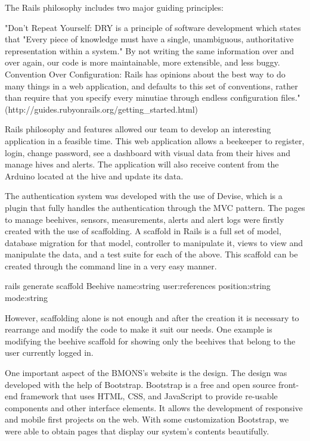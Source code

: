 The Rails philosophy includes two major guiding principles:

"Don't Repeat Yourself: DRY is a principle of software development which states that "Every piece of knowledge must have a single, unambiguous, authoritative representation within a system." By not writing the same information over and over again, our code is more maintainable, more extensible, and less buggy.
Convention Over Configuration: Rails has opinions about the best way to do many things in a web application, and defaults to this set of conventions, rather than require that you specify every minutiae through endless configuration files."
(http://guides.rubyonrails.org/getting_started.html)

Rails philosophy and features allowed our team to develop an interesting application in a feasible time. This web application allows a beekeeper to register, login, change password, see a dashboard with visual data from their hives and manage hives and alerts. The application will also receive content from the Arduino located at the hive and update its data.

The authentication system was developed with the use of Devise, which is a plugin that fully handles the authentication through the MVC pattern. The pages to manage beehives, sensors, measurements, alerts and alert logs were firstly created with the use of scaffolding. A scaffold in Rails is a full set of model, database migration for that model, controller to manipulate it, views to view and manipulate the data, and a test suite for each of the above. This scaffold can be created through the command line in a very easy manner.

rails generate scaffold Beehive name:string user:references position:string mode:string

However, scaffolding alone is not enough and after the creation it is necessary to rearrange and modify the code to make it suit our needs. One example is modifying the beehive scaffold for showing only the beehives that belong to the user currently logged in.

One important aspect of the BMONS's website is the design. The design was developed with the help of Bootstrap. Bootstrap is a free and open source front-end framework that uses HTML, CSS, and JavaScript to provide re-usable components and other interface elements. It allows the development of responsive and mobile first projects on the web. With some customization Bootstrap, we were able to obtain pages that display our system's contents beautifully.

